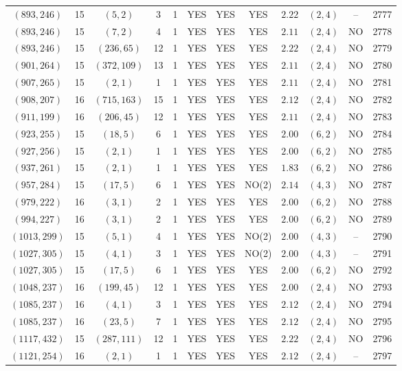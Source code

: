 \begin{longtable}{|c|c|c|c|c|c|c|c|c|c|c|c|}
$(893,246)$ & 15 & $(5,2)$ & 3 & 1 & YES & YES & YES & $2.22$ & $(2,4)$ & -- & 2777\\
$(893,246)$ & 15 & $(7,2)$ & 4 & 1 & YES & YES & YES & $2.11$ & $(2,4)$ & NO & 2778\\
$(893,246)$ & 15 & $(236,65)$ & 12 & 1 & YES & YES & YES & $2.22$ & $(2,4)$ & NO & 2779\\
$(901,264)$ & 15 & $(372,109)$ & 13 & 1 & YES & YES & YES & $2.11$ & $(2,4)$ & NO & 2780\\
$(907,265)$ & 15 & $(2,1)$ & 1 & 1 & YES & YES & YES & $2.11$ & $(2,4)$ & NO & 2781\\
$(908,207)$ & 16 & $(715,163)$ & 15 & 1 & YES & YES & YES & $2.12$ & $(2,4)$ & NO & 2782\\
$(911,199)$ & 16 & $(206,45)$ & 12 & 1 & YES & YES & YES & $2.11$ & $(2,4)$ & NO & 2783\\
$(923,255)$ & 15 & $(18,5)$ & 6 & 1 & YES & YES & YES & $2.00$ & $(6,2)$ & NO & 2784\\
$(927,256)$ & 15 & $(2,1)$ & 1 & 1 & YES & YES & YES & $2.00$ & $(6,2)$ & NO & 2785\\
$(937,261)$ & 15 & $(2,1)$ & 1 & 1 & YES & YES & YES & $1.83$ & $(6,2)$ & NO & 2786\\
$(957,284)$ & 15 & $(17,5)$ & 6 & 1 & YES & YES & NO(2) & $2.14$ & $(4,3)$ & NO & 2787\\
$(979,222)$ & 16 & $(3,1)$ & 2 & 1 & YES & YES & YES & $2.00$ & $(6,2)$ & NO & 2788\\
$(994,227)$ & 16 & $(3,1)$ & 2 & 1 & YES & YES & YES & $2.00$ & $(6,2)$ & NO & 2789\\
$(1013,299)$ & 15 & $(5,1)$ & 4 & 1 & YES & YES & NO(2) & $2.00$ & $(4,3)$ & -- & 2790\\
$(1027,305)$ & 15 & $(4,1)$ & 3 & 1 & YES & YES & NO(2) & $2.00$ & $(4,3)$ & -- & 2791\\
$(1027,305)$ & 15 & $(17,5)$ & 6 & 1 & YES & YES & YES & $2.00$ & $(6,2)$ & NO & 2792\\
$(1048,237)$ & 16 & $(199,45)$ & 12 & 1 & YES & YES & YES & $2.00$ & $(2,4)$ & NO & 2793\\
$(1085,237)$ & 16 & $(4,1)$ & 3 & 1 & YES & YES & YES & $2.12$ & $(2,4)$ & NO & 2794\\
$(1085,237)$ & 16 & $(23,5)$ & 7 & 1 & YES & YES & YES & $2.12$ & $(2,4)$ & NO & 2795\\
$(1117,432)$ & 15 & $(287,111)$ & 12 & 1 & YES & YES & YES & $2.22$ & $(2,4)$ & NO & 2796\\
$(1121,254)$ & 16 & $(2,1)$ & 1 & 1 & YES & YES & YES & $2.12$ & $(2,4)$ & -- & 2797\\

\end{longtable}
